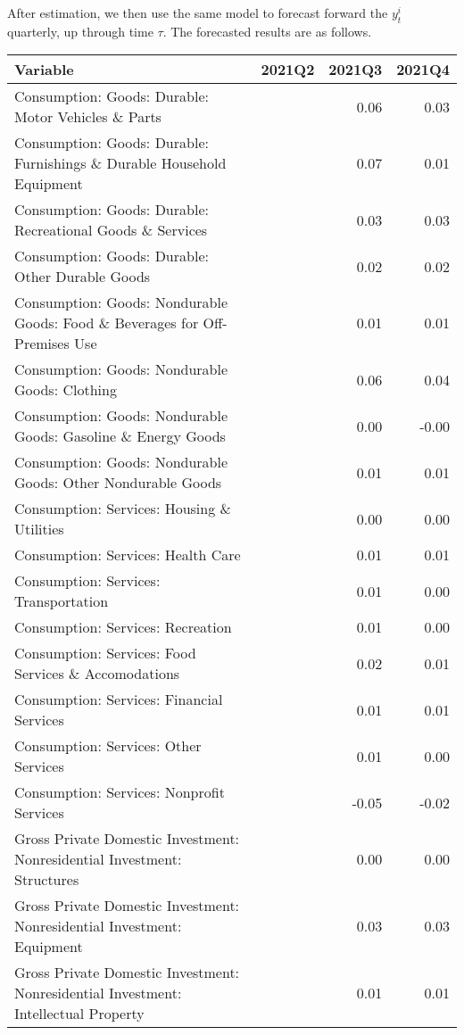 \documentclass[11pt, letterpaper]{article}\usepackage[]{graphicx}\usepackage[]{color}
\begin{document}
After estimation, we then use the same model to forecast forward the $y^i_t$ quarterly, up through time $\tau$. 
The forecasted results are as follows.
\begin{table}[H]
\centering
\begingroup\scriptsize
\begin{tabular}{lrrr}
  \hline
Variable & 2021Q2 & 2021Q3 & 2021Q4 \\ 
  \hline
Consumption: Goods: Durable: Motor Vehicles \& Parts &  & 0.06 & 0.03 \\ 
  Consumption: Goods: Durable: Furnishings \& Durable Household Equipment &  & 0.07 & 0.01 \\ 
  Consumption: Goods: Durable: Recreational Goods \& Services &  & 0.03 & 0.03 \\ 
  Consumption: Goods: Durable: Other Durable Goods &  & 0.02 & 0.02 \\ 
  Consumption: Goods: Nondurable Goods: Food \& Beverages for Off-Premises Use &  & 0.01 & 0.01 \\ 
  Consumption: Goods: Nondurable Goods: Clothing &  & 0.06 & 0.04 \\ 
  Consumption: Goods: Nondurable Goods: Gasoline \& Energy Goods &  & 0.00 & -0.00 \\ 
  Consumption: Goods: Nondurable Goods: Other Nondurable Goods &  & 0.01 & 0.01 \\ 
  Consumption: Services: Housing \& Utilities &  & 0.00 & 0.00 \\ 
  Consumption: Services: Health Care &  & 0.01 & 0.01 \\ 
  Consumption: Services: Transportation &  & 0.01 & 0.00 \\ 
  Consumption: Services: Recreation &  & 0.01 & 0.00 \\ 
  Consumption: Services: Food Services \& Accomodations &  & 0.02 & 0.01 \\ 
  Consumption: Services: Financial Services &  & 0.01 & 0.01 \\ 
  Consumption: Services: Other Services &  & 0.01 & 0.00 \\ 
  Consumption: Services: Nonprofit Services &  & -0.05 & -0.02 \\ 
  Gross Private Domestic Investment: Nonresidential Investment: Structures &  & 0.00 & 0.00 \\ 
  Gross Private Domestic Investment: Nonresidential Investment: Equipment &  & 0.03 & 0.03 \\ 
  Gross Private Domestic Investment: Nonresidential Investment: Intellectual Property &  & 0.01 & 0.01 \\ 

\end{tabular}
\end{table}
\end{document}
